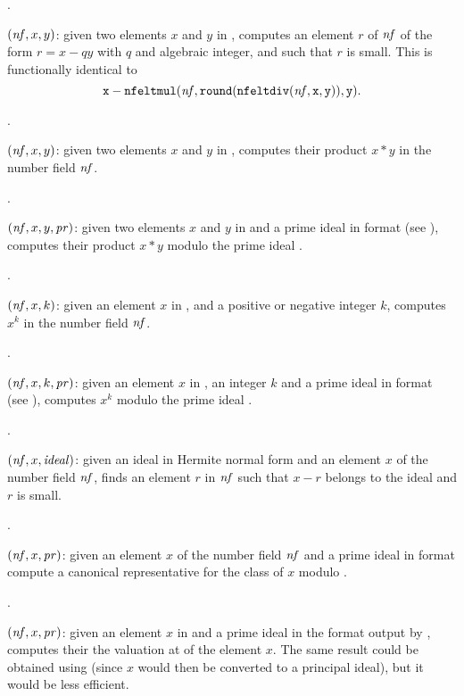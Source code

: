 .

$(\hbox{\it nf\/},x,y)$: given two elements $x$ and $y$ in
, computes an element $r$ of $\hbox{\it nf\/}$ of the form $r=x-qy$ with
$q$ and algebraic integer, and such that $r$ is small. This is functionally
identical to
$${\tt x - nfeltmul(\hbox{\it nf\/},round(nfeltdiv(\hbox{\it nf\/},x,y)),y)}.$$

.

$(\hbox{\it nf\/},x,y)$: given two elements $x$ and $y$ in
, computes their product $x*y$ in the number field $\hbox{\it nf\/}$.

.

$(\hbox{\it nf\/},x,y,\hbox{\it pr\/})$: given two elements $x$ and
$y$ in  and  a prime ideal in  format (see
), computes their product $x*y$ modulo the prime ideal
.

.

$(\hbox{\it nf\/},x,k)$: given an element $x$ in ,
and a positive or negative integer $k$, computes $x^k$ in the number field
$\hbox{\it nf\/}$.

.

$(\hbox{\it nf\/},x,k,\hbox{\it pr\/})$: given an element $x$ in
, an integer $k$ and a prime ideal  in  format
(see ), computes $x^k$ modulo the prime ideal .

.

$(\hbox{\it nf\/},x,\hbox{\it ideal\/})$: given an ideal in
Hermite normal form and an element $x$ of the number field $\hbox{\it nf\/}$,
finds an element $r$ in $\hbox{\it nf\/}$ such that $x-r$ belongs to the ideal
and $r$ is small.

.

$(\hbox{\it nf\/},x,\hbox{\it pr\/})$: given
an element $x$ of the number field $\hbox{\it nf\/}$ and a prime ideal  in
 format compute a canonical representative for the class of $x$
modulo .

.

$(\hbox{\it nf\/},x,\hbox{\it pr\/})$: given an element $x$ in
 and a prime ideal  in the format output by
, computes their the valuation at  of the
element $x$. The same result could be obtained using
 (since $x$ would then be converted to a
principal ideal), but it would be less efficient.

